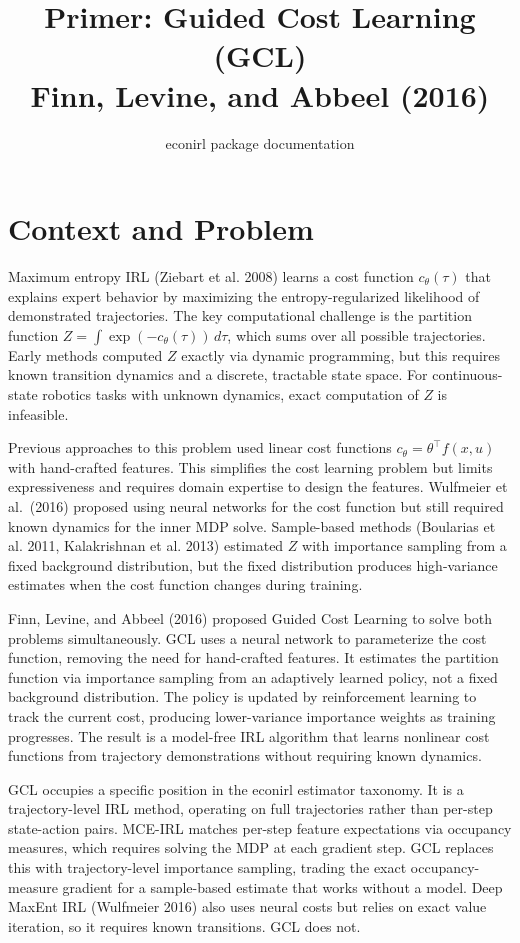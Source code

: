 \documentclass[11pt]{article}
\title{Primer: Guided Cost Learning (GCL)\\[4pt]
\large Finn, Levine, and Abbeel (2016)}
\author{econirl package documentation}
\date{}
\begin{document}
\maketitle

\section{Context and Problem}

Maximum entropy IRL (Ziebart et al. 2008) learns a cost function $c_\theta(\tau)$ that explains expert behavior by maximizing the entropy-regularized likelihood of demonstrated trajectories.
The key computational challenge is the partition function $Z = \int \exp(-c_\theta(\tau))\,d\tau$, which sums over all possible trajectories.
Early methods computed $Z$ exactly via dynamic programming, but this requires known transition dynamics and a discrete, tractable state space.
For continuous-state robotics tasks with unknown dynamics, exact computation of $Z$ is infeasible.

Previous approaches to this problem used linear cost functions $c_\theta = \theta^\top f(x,u)$ with hand-crafted features.
This simplifies the cost learning problem but limits expressiveness and requires domain expertise to design the features.
Wulfmeier et al.\ (2016) proposed using neural networks for the cost function but still required known dynamics for the inner MDP solve.
Sample-based methods (Boularias et al. 2011, Kalakrishnan et al. 2013) estimated $Z$ with importance sampling from a fixed background distribution, but the fixed distribution produces high-variance estimates when the cost function changes during training.

Finn, Levine, and Abbeel (2016) proposed Guided Cost Learning to solve both problems simultaneously.
GCL uses a neural network to parameterize the cost function, removing the need for hand-crafted features.
It estimates the partition function via importance sampling from an adaptively learned policy, not a fixed background distribution.
The policy is updated by reinforcement learning to track the current cost, producing lower-variance importance weights as training progresses.
The result is a model-free IRL algorithm that learns nonlinear cost functions from trajectory demonstrations without requiring known dynamics.

GCL occupies a specific position in the econirl estimator taxonomy.
It is a trajectory-level IRL method, operating on full trajectories rather than per-step state-action pairs.
MCE-IRL matches per-step feature expectations via occupancy measures, which requires solving the MDP at each gradient step.
GCL replaces this with trajectory-level importance sampling, trading the exact occupancy-measure gradient for a sample-based estimate that works without a model.
Deep MaxEnt IRL (Wulfmeier 2016) also uses neural costs but relies on exact value iteration, so it requires known transitions.
GCL does not.
\end{document}
